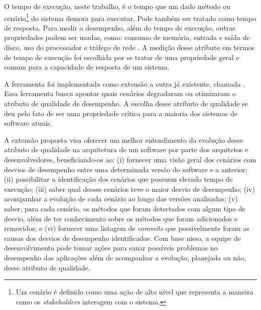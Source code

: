 O tempo de execução, neste trabalho, é o tempo que um dado método ou cenário\footnote{Um cenário é definido como uma ação de alto nível que representa a maneira como os \textit{stakeholders} interagem com o sistema.} do sistema demora para executar. Pode também ser tratado como tempo de resposta. Para medir o desempenho, além do tempo de execução, outras propriedades podem ser usadas, como: consumo de memória, entrada e saída de disco, uso do processador e tráfego de rede \cite{Malik2013}. A medição desse atributo em termos de tempo de execução foi escolhida por se tratar de uma propriedade geral e comum para a capacidade de resposta de um sistema.


A ferramenta foi implementada como extensão a outra já existente, chamada \textit{\perfMinerName} \cite{Pinto2015}. Essa ferramenta busca apontar quais cenários degradaram ou otimizaram o atributo de qualidade de desempenho. A escolha desse atributo de qualidade se deu pelo fato de ser uma propriedade crítica para a maioria dos sistemas de software atuais.

A extensão proposta visa oferecer um melhor entendimento da evolução desse atributo de qualidade na arquitetura de um software por parte dos arquitetos e desenvolvedores, beneficiando-os ao: (i) fornecer uma visão geral dos cenários com desvios de desempenho entre uma determinada versão do software e a anterior; (ii) possibilitar a identificação dos cenários que possuem elevado tempo de execução; (iii) saber qual desses cenários teve o maior desvio de desempenho; (iv) acompanhar a evolução de cada cenário ao longo das versões analisadas; (v) saber, para cada cenário, os métodos que foram detectados com algum tipo de desvio, além de ter conhecimento sobre os métodos que foram adicionados e removidos; e (vi) fornecer uma listagem de \textit{commits} que possivelmente foram as causas dos desvios de desempenho identificados. Com base nisso, a equipe de desenvolvimento pode tomar ações para sanar possíveis problemas no desempenho das aplicações além de acompanhar a evolução, planejada ou não, desse atributo de qualidade.


